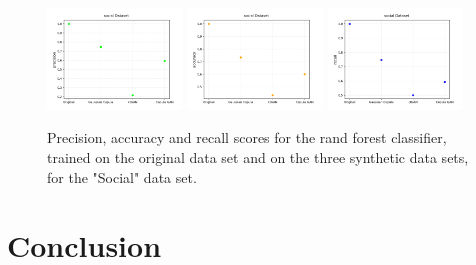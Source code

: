 \documentclass{article}
\begin{document}
\begin{figure}[h!]
	\centering
	\includegraphics[width=0.32\textwidth]{../plots/results/social_precision.png}
	\includegraphics[width=0.32\textwidth]{../plots/results/social_accuracy.png}
	\includegraphics[width=0.32\textwidth]{../plots/results/social_recall.png}

	\caption{Precision, accuracy and recall scores for the rand forest classifier, trained on the original data set and on the three synthetic data sets, for the "Social" data set.}
	\label{scores_social}
\end{figure}




\clearpage
\section{Conclusion}

\clearpage
{}

\end{document}
